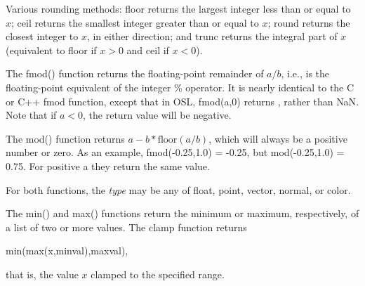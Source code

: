 \documentclass[11pt,letterpaper]{book}
\def\color{{\cf color}\xspace}
\def\normal{{\cf normal}\xspace}
\def\point{{\cf point}\xspace}
\def\vector{{\cf vector}\xspace}
\begin{document}
   

Various rounding methods: {\cf floor} returns the largest integer less
than or equal to $x$; {\cf ceil} returns the smallest integer greater than
or equal to $x$; {\cf round} returns the closest integer to $x$, in
either direction; and {\cf trunc} returns the integral part of $x$
(equivalent to {\cf floor} if $x>0$ and {\cf ceil} if $x<0$).
\apiend


The {\cf fmod()} function returns the floating-point remainder of $a/b$,
i.e., is the floating-point equivalent of the integer {\cf \%} operator.
It is nearly identical to the C or C++ {\cf fmod} function, except that
in OSL, {\cf fmod(a,0)} returns {}, rather than {\cf NaN}.  Note
that if $a < 0$, the return value will be negative.

The {\cf mod()} function returns $a - b*\mbox{floor}(a/b)$, which will
always be a positive number or zero.  
As an example, {\cf fmod(-0.25,1.0) = -0.25}, but {\cf mod(-0.25,1.0) =
  0.75}.  For positive {\cf a} they return the same value.

For both functions, the \emph{type} may be any of {\cf float}, \point,
\vector, \normal, or \color.
\apiend

  
The {\cf min()} and {\cf max()} functions return the minimum or maximum,
respectively, of a list of two or more values.  The {\cf clamp}
function returns

\hspace{2em} {\cf min(max(x,minval),maxval)},

\noindent that is, the value $x$ clamped to the specified range.
\apiend
\end{document}
